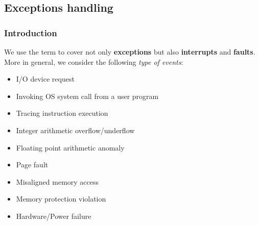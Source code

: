 \subsection{Exceptions handling}

\subsubsection{Introduction}

We use the term  to cover not only \textbf{exceptions} but also \textbf{interrupts} and \textbf{faults}. More in general, we consider the following \emph{type of events}:
\begin{itemize}
    \item I/O device request
    \item Invoking OS system call from a user program
    \item Tracing instruction execution
    \item Integer arithmetic overflow/underflow
    \item Floating point arithmetic anomaly
    \item Page fault
    \item Misaligned memory access
    \item Memory protection violation
    \item Hardware/Power failure
\end{itemize}

